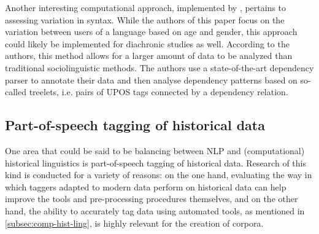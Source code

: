Another interesting computational approach, implemented by \citet{johannsen-etal-2015-cross}, pertains to assessing variation in syntax. While the authors of this paper focus on the variation between users of a language based on age and gender, this approach could likely be implemented for diachronic studies as well. According to the authors, this method allows for a larger amount of data to be analyzed than traditional sociolinguistic methods. The authors use a state-of-the-art dependency parser to annotate their data and then analyse dependency patterns based on so-called treelets, i.e. pairs of UPOS tags connected by a dependency relation. 

\subsection{Part-of-speech tagging of historical data}
\label{subsec:historical-pos-tagging}

One area that could be said to be balancing between NLP and (computational) historical linguistics is part-of-speech tagging of historical data. Research of this kind is conducted for a variety of reasons: on the one hand, evaluating the way in which taggers adapted to modern data perform on historical data can help improve the tools and pre-processing procedures themselves, and on the other hand, the ability to accurately tag data using automated tools, as mentioned in \autoref{subsec:comp-hist-ling}, is highly relevant for the creation of corpora. 

